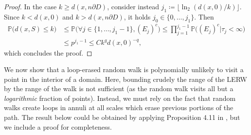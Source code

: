 \documentclass[11pt]{article}
\begin{document}
\begin{proof}
    In the case $k\geq d(x,n \partial D)$, consider instead
    $j_1\coloneqq \lfloor \ln_2(d(x,0)/k )\rfloor$.
    Since $k<d(x,0)$ and $k>d(x,n \partial D)$, it holds $j_0\in\{0,\dots, j_1\}$.
    Then
    \begin{align*}
    \mathbb{P}\big( d(x,S)\leq  k\big)
    & \leq \mathbb{P} \big( \forall j\in \{1,\dots, j_1-1\} , (E_j)^c \big)
    \leq \prod_{j=1}^{j_1-1} \mathbb{P} \big(  (E_j)^c\big|  \tau_j<\infty \big) \\ &\leq p^{j_1-1}
    \leq C k^q  d(x, 0)^{-q},
    \end{align*}
    which concludes the proof.
\end{proof}



We now show that a loop-erased random walk is polynomially unlikely to visit a point in the interior of a domain. Here, bounding crudely the range of the LERW by the range of the walk is not sufficient (as the random walk visits all but a \emph{logarithmic} fraction of points). Instead, we must rely on the fact that random walks create loops in annuli at all scales which erase previous portions of the path. The result below could be obtained by applying Proposition 4.11 in \cite{BLR}, but we include a proof for completeness.
\end{document}
